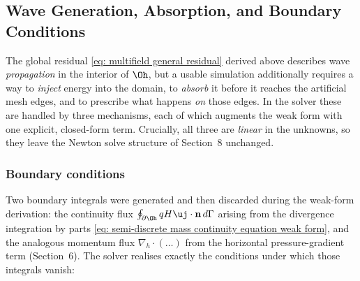 %
%

\subsection*{Wave Generation, Absorption, and Boundary Conditions}

The global residual \eqref{eq: multifield general residual} derived above describes wave
\emph{propagation} in the interior of $\Oh$, but a usable simulation additionally requires a way to
\emph{inject} energy into the domain, to \emph{absorb} it before it reaches the artificial mesh
edges, and to prescribe what happens \emph{on} those edges. In the solver these are handled by three
mechanisms, each of which augments the weak form with one explicit, closed-form term. Crucially, all
three are \emph{linear} in the unknowns, so they leave the Newton solve structure of
Section~8 unchanged.

\subsubsection*{Boundary conditions}

Two boundary integrals were generated and then discarded during the weak-form derivation: the
continuity flux $\oint_{\partial\Oh} q H\uj\cdot\mathbf{n}\,d\Gamma$ arising from the divergence
integration by parts \eqref{eq: semi-discrete mass continuity equation weak form}, and the analogous
momentum flux $\nabla_h\cdot(\dots)$ from the horizontal pressure-gradient term (Section~6). The
solver realises exactly the conditions under which those integrals vanish:


